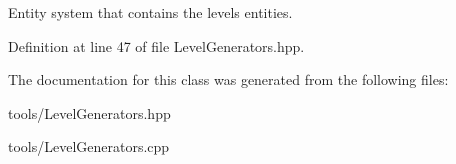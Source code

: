 Entity system that contains the level\textquotesingle{}s entities. 



Definition at line 47 of file Level\+Generators.\+hpp.



The documentation for this class was generated from the following files\+:\begin{DoxyCompactItemize}
\item 
tools/Level\+Generators.\+hpp\item 
tools/Level\+Generators.\+cpp\end{DoxyCompactItemize}
